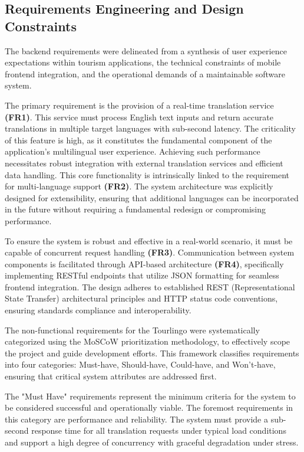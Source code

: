 \subsection{Requirements Engineering and Design Constraints}

The backend requirements were delineated from a synthesis of user experience expectations within tourism applications, the technical constraints of mobile frontend integration, and the operational demands of a maintainable software system.\cite{requirements-engineering-process}

The primary requirement is the provision of a real-time translation service \textbf{(FR1)}\cite{open-nmt}. This service must process English text inputs and return accurate translations in multiple target languages with sub-second latency. The criticality of this feature is high, as it constitutes the fundamental component of the application's multilingual user experience. Achieving such performance necessitates robust integration with external translation services and efficient data handling. This core functionality is intrinsically linked to the requirement for multi-language support \textbf{(FR2)}. The system architecture was explicitly designed for extensibility, ensuring that additional languages can be incorporated in the future without requiring a fundamental redesign or compromising performance. 

To ensure the system is robust and effective in a real-world scenario, it must be capable of concurrent request handling \textbf{(FR3)}. Communication between system components is facilitated through API-based architecture \textbf{(FR4)}, specifically implementing RESTful  endpoints that utilize JSON formatting for seamless frontend integration. The design adheres to established REST (Representational State Transfer) architectural principles and HTTP status code conventions, ensuring standards compliance and interoperability\cite{RESTful}\cite{fullstacktips2023restful}.

The non-functional requirements for the Tourlingo were systematically categorized using the MoSCoW prioritization methodology\cite{productplan2019moscow}\cite{wikipedia2025moscow}, to effectively scope the project and guide development efforts. This framework classifies requirements into four categories: Must-have, Should-have, Could-have, and Won't-have, ensuring that critical system attributes are addressed first.

The "Must Have"  requirements represent the minimum criteria for the system to be considered successful and operationally viable. The foremost requirements in this category are performance and reliability. The system must provide a sub-second response time for all translation requests under typical load conditions and support a high degree of concurrency with graceful degradation under stress.

